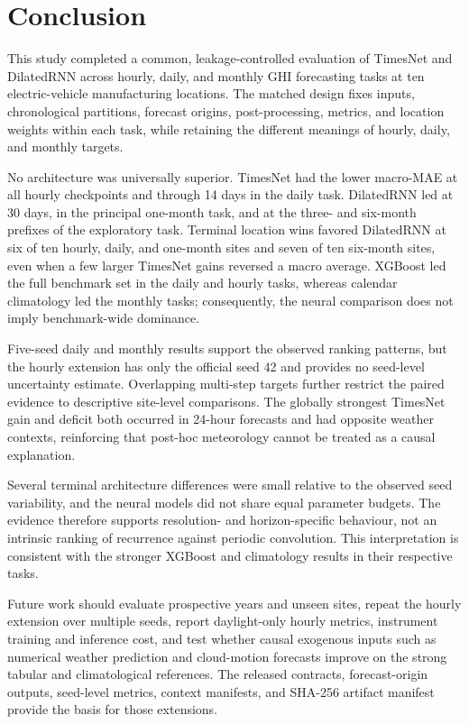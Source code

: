 \section{Conclusion}
\label{sec:conclusion}

This study completed a common, leakage-controlled evaluation of TimesNet and
DilatedRNN across hourly, daily, and monthly GHI forecasting tasks at ten
electric-vehicle manufacturing locations. The matched design fixes inputs,
chronological partitions, forecast origins, post-processing, metrics, and
location weights within each task, while retaining the different meanings of
hourly, daily, and monthly targets.

No architecture was universally superior. TimesNet had the lower macro-MAE at
all hourly checkpoints and through 14 days in the daily task. DilatedRNN led at
30 days, in the principal one-month task, and at the three- and six-month
prefixes of the exploratory task. Terminal location wins favored DilatedRNN at
six of ten hourly, daily, and one-month sites and seven of ten six-month sites,
even when a few larger TimesNet gains reversed a macro average. XGBoost led the
full benchmark set in the daily and hourly tasks, whereas calendar climatology
led the monthly tasks; consequently, the neural comparison does not imply
benchmark-wide dominance.

Five-seed daily and monthly results support the observed ranking patterns, but
the hourly extension has only the official seed 42 and provides no seed-level
uncertainty estimate. Overlapping multi-step targets further restrict the
paired evidence to descriptive site-level comparisons. The globally strongest
TimesNet gain and deficit both occurred in 24-hour forecasts and had opposite
weather contexts, reinforcing that post-hoc meteorology cannot be treated as a
causal explanation.

Several terminal architecture differences were small relative to the observed
seed variability, and the neural models did not share equal parameter budgets.
The evidence therefore supports resolution- and horizon-specific behaviour,
not an intrinsic ranking of recurrence against periodic convolution. This
interpretation is consistent with the stronger XGBoost and climatology results
in their respective tasks.

Future work should evaluate prospective years and unseen sites, repeat the
hourly extension over multiple seeds, report daylight-only hourly metrics,
instrument training and inference cost, and test whether causal exogenous
inputs such as numerical weather prediction and cloud-motion forecasts improve
on the strong tabular and climatological references. The released contracts,
forecast-origin outputs, seed-level metrics, context manifests, and SHA-256
artifact manifest provide the basis for those extensions.
